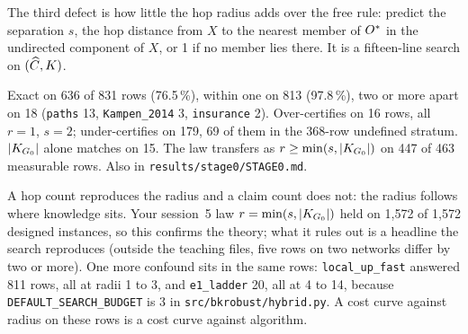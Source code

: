 The third defect is how little the hop radius adds over the free rule: predict the separation $s$, the hop distance from $X$ to
the nearest member of $O^{*}$ in the undirected component of $X$, or 1 if no member lies there. It is a fifteen-line search on
$(\widehat{C}, K)$.

\begin{medido}
Exact on 636 of 831 rows (76.5\,\%), within one on 813 (97.8\,\%), two or more apart on 18 (\texttt{paths} 13, \texttt{Kampen\_2014}
3, \texttt{insurance} 2). Over-certifies on 16 rows, all $r = 1$, $s = 2$; under-certifies on 179, 69 of them in the 368-row
undefined stratum. $|K_{G_0}|$ alone matches on 15. The law transfers as $r \ge \min(s, |K_{G_0}|)$ on 447 of 463 measurable rows.
Also in \texttt{results/stage0/STAGE0.md}.
\end{medido}

A hop count reproduces the radius and a claim count does not: the radius follows where knowledge sits. Your session~5 law
$r = \min(s, |K_{G_0}|)$ held on 1,572 of 1,572 designed instances, so this confirms the theory; what it rules out is a headline the
search reproduces (outside the teaching files, five rows on two networks differ by two or more). One more confound sits in the same rows: \texttt{local\_up\_fast} answered 811 rows, all at radii 1 to 3, and
\texttt{e1\_ladder} 20, all at 4 to 14, because \texttt{DEFAULT\_SEARCH\_BUDGET} is 3 in \texttt{src/bkrobust/hybrid.py}. A cost
curve against radius on these rows is a cost curve against algorithm.



